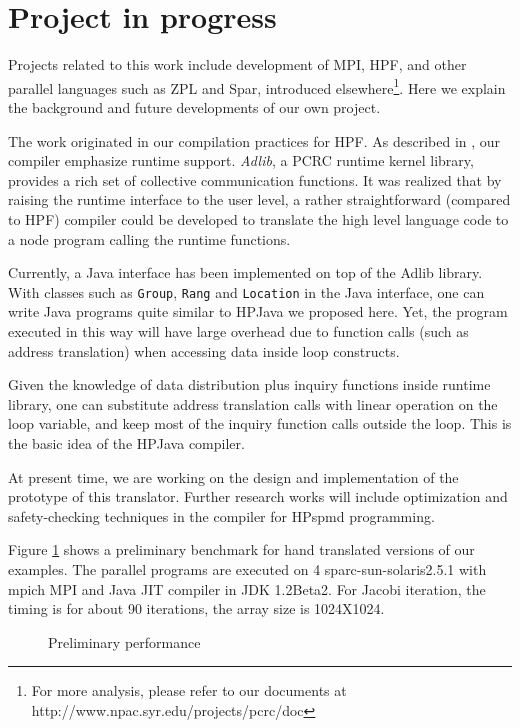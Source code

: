\section{Project in progress}

Projects related to this work include development of MPI, HPF,
and other parallel languages such as ZPL and Spar,
introduced elsewhere\footnote{For more analysis, please refer to our
documents at http://www.npac.syr.edu/projects/pcrc/doc}.  Here we
explain the background and future developments of our own
project.

The work originated in our compilation practices for HPF. As described
in \cite{Zha97}, our compiler emphasize runtime support.
\emph{Adlib}\cite{Car98}, a PCRC runtime kernel library, provides a
rich set of collective communication functions.  It was realized that
by raising the runtime interface to the user level, a rather
straightforward (compared to HPF) compiler could be developed to
translate the high level language code to a node program calling the
runtime functions.

Currently, a Java interface has been implemented on top of the Adlib
library.  With classes such as \texttt{Group}, \texttt{Rang} and
\texttt{Location} in the Java interface, one can write Java programs
quite similar to HPJava we proposed here. Yet, the program executed in
this way will have large overhead due to function calls (such as
address translation) when accessing data inside loop constructs.

Given the knowledge of data distribution plus inquiry functions inside
runtime library, one can substitute address translation calls with
linear operation on the loop variable, and keep most of the inquiry
function calls outside the loop. This is the basic idea of
the HPJava compiler.

At present time, we are working on the design and implementation of
the prototype of this translator.  Further research works
will include optimization and safety-checking techniques in the
compiler for HPspmd programming.

Figure \ref{fig:performance} shows a preliminary benchmark for hand
translated versions of our examples. The parallel programs are executed
on 4 sparc-sun-solaris2.5.1 with mpich MPI and Java JIT compiler in
JDK 1.2Beta2. For Jacobi iteration, the timing is for about 90
iterations, the array size is 1024X1024.

\begin{figure}[ht]
  \begin{center}
    \leavevmode
    \caption{Preliminary performance}
    \label{fig:performance}
  \end{center}
\end{figure}

